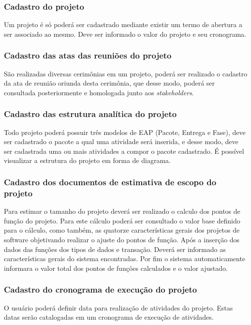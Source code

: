 \documentclass{acm_proc_article-sp}
\begin{document}
\subsubsection{Cadastro do projeto}
Um projeto é só poderá ser cadastrado mediante existir um termo de abertura a ser associado ao mesmo. Deve ser informado o valor do projeto e seu cronograma.

\subsubsection{Cadastro das atas das reuniões do projeto}
São realizadas diversas cerimônias em um projeto, poderá ser realizado o cadastro da ata de reunião oriunda desta cerimônia, que desse modo, poderá ser consultada posteriormente e homologada junto aos \textit{stakeholders}.

\subsubsection{Cadastro das estrutura analítica do projeto}
Todo projeto poderá possuir três modelos de EAP (Pacote, Entrega e Fase), deve ser cadastrado o pacote a qual uma atividade será inserida, e desse modo, deve ser cadastrada uma ou mais atividades a compor o pacote cadastrado. É possível visualizar a estrutura do projeto em forma de diagrama. 

\subsubsection{Cadastro dos documentos de estimativa de escopo do projeto}
Para estimar o tamanho do projeto deverá ser realizado o calculo dos pontos de função do projeto. Para este cálculo poderá ser consultado o valor base definido para o cálculo, como também, as quatorze características gerais dos projetos de software objetivando realizar o ajuste do pontos de função. Após a inserção dos dados das funções dos tipos de dados e transação. Deverá ser informado as características gerais do sistema encontradas. Por fim o sistema automaticamente informara o valor total dos pontos de funções calculados e o valor ajustado.

\subsubsection{Cadastro do cronograma de execução do projeto}
O usuário poderá definir data para realização de atividades do projeto. Estas datas serão catalogadas em um cronograma de execução de atividades.
\end{document}
